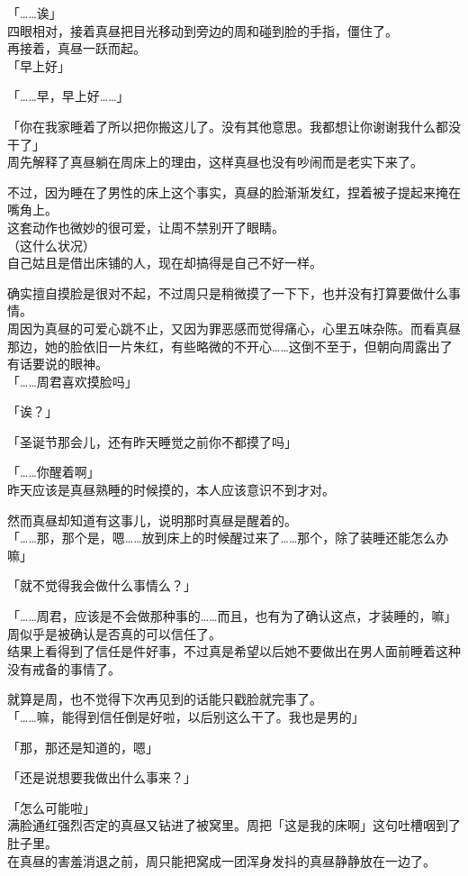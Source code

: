 「……诶」\\

四眼相对，接着真昼把目光移动到旁边的周和碰到脸的手指，僵住了。\\

再接着，真昼一跃而起。\\

「早上好」

「……早，早上好……」

「你在我家睡着了所以把你搬这儿了。没有其他意思。我都想让你谢谢我什么都没干了」\\

周先解释了真昼躺在周床上的理由，这样真昼也没有吵闹而是老实下来了。

不过，因为睡在了男性的床上这个事实，真昼的脸渐渐发红，捏着被子提起来掩在嘴角上。\\

这套动作也微妙的很可爱，让周不禁别开了眼睛。\\

（这什么状况）\\

自己姑且是借出床铺的人，现在却搞得是自己不好一样。

确实擅自摸脸是很对不起，不过周只是稍微摸了一下下，也并没有打算要做什么事情。\\

周因为真昼的可爱心跳不止，又因为罪恶感而觉得痛心，心里五味杂陈。而看真昼那边，她的脸依旧一片朱红，有些略微的不开心……这倒不至于，但朝向周露出了有话要说的眼神。\\

「……周君喜欢摸脸吗」

「诶？」

「圣诞节那会儿，还有昨天睡觉之前你不都摸了吗」

「……你醒着啊」\\

昨天应该是真昼熟睡的时候摸的，本人应该意识不到才对。

然而真昼却知道有这事儿，说明那时真昼是醒着的。\\

「……那，那个是，嗯……放到床上的时候醒过来了……那个，除了装睡还能怎么办嘛」

「就不觉得我会做什么事情么？」

「……周君，应该是不会做那种事的……而且，也有为了确认这点，才装睡的，嘛」\\

周似乎是被确认是否真的可以信任了。\\

结果上看得到了信任是件好事，不过真是希望以后她不要做出在男人面前睡着这种没有戒备的事情了。

就算是周，也不觉得下次再见到的话能只戳脸就完事了。\\

「……嘛，能得到信任倒是好啦，以后别这么干了。我也是男的」

「那，那还是知道的，嗯」

「还是说想要我做出什么事来？」

「怎么可能啦」\\

满脸通红强烈否定的真昼又钻进了被窝里。周把「这是我的床啊」这句吐槽咽到了肚子里。\\

在真昼的害羞消退之前，周只能把窝成一团浑身发抖的真昼静静放在一边了。
